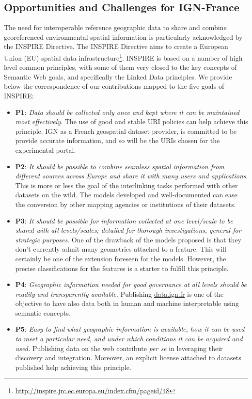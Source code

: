 \subsection{Opportunities and Challenges for IGN-France}
\label{sec:challenges}

 The need for interoperable reference geographic data to share and combine georeferenced environmental spatial information is particularly acknowledged by the INSPIRE Directive. The INSPIRE Directive \cite{inspire2009} aims to create a European Union (EU) spatial data infrastructure\footnote{\url{ http://inspire.jrc.ec.europa.eu/index.cfm/pageid/48}}. INSPIRE is based on a number of high level common principles, with some of them very closed to the key concepts of Semantic Web goals, and specifically the Linked Data principles. We provide below the correspondence of our contributions mapped to the five goals of INSPIRE:  
\begin{itemize}
\item \textbf{P1}: \textit{Data should be collected only once and kept where it can be maintained most effectively}. The use of good and stable URI policies can help achieve this principle. IGN as a French geospatial dataset provider, is committed to be provide accurate information, and so will be the URIs chosen for the experimental portal.
\item \textbf{P2}: \textit{It should be possible to combine seamless spatial information from different sources across Europe and share it with many users and applications}. This is more or less the goal of the interlinking tasks performed with other datasets on the wild. The models developed and well-documented can ease the conversion by other mapping agencies or institutions of their datasets.  
\item \textbf{P3}:  \textit{It should be possible for information collected at one level/scale to be shared with all levels/scales; detailed for thorough investigations, general for strategic purposes}. One of the drawback of the models proposed is that they don't currently admit many geometries attached to a feature. This will certainly be one of the extension foreseen for the models. However, the precise classifications for the features is a starter to fulfill this principle.
\item \textbf{P4}: \textit{Geographic information needed for good governance at all levels should be readily and transparently available}. Publishing \url{data.ign.fr} is one of the objective to have also data both in human and machine interpretable using semantic concepts.
\item \textbf{P5}: \textit{Easy to find what geographic information is available, how it can be used to meet a particular need, and under which conditions it can be acquired and used.} Publishing data on the web contribute \textit{per se} in leveraging their discovery and integration. Moreover, an explicit license attached to datasets published help achieving this principle.
\end{itemize}
